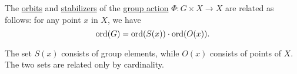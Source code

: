 \begin{theorem}\label{thm:orbit_stabilizer_theorem}
  The \hyperref[def:group_action_orbit]{orbits} and \hyperref[def:group_action_stabilizer]{stabilizers} of the \hyperref[def:group_action]{group action} \( \Phi: G \times X \to X \) are related as follows: for any point \( x \) in \( X \), we have
  \begin{equation}\label{eq:thm:orbit_stabilizer_theorem}
    \operatorname{ord}(G) = \operatorname{ord}(S(x)) \cdot \operatorname{ord}(O(x)).
  \end{equation}
\end{theorem}
\begin{comments}
  \item The set \( S(x) \) consists of group elements, while \( O(x) \) consists of points of \( X \).  The two sets are related only by cardinality.
\end{comments}
